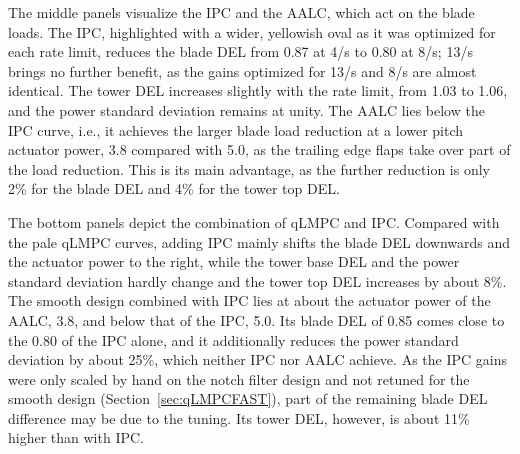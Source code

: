 The middle panels visualize the IPC and the AALC, which act on the blade loads. The IPC, highlighted with a wider, yellowish oval as it was optimized for each rate limit, reduces the blade DEL from 0.87 at 4\textdegree/s to 0.80 at 8\textdegree/s; 13\textdegree/s brings no further benefit, as the gains optimized for 13\textdegree/s and 8\textdegree/s are almost identical. The tower DEL increases slightly with the rate limit, from 1.03 to 1.06, and the power standard deviation remains at unity. The AALC lies below the IPC curve, i.e., it achieves the larger blade load reduction at a lower pitch actuator power, 3.8 compared with 5.0, as the trailing edge flaps take over part of the load reduction. This is its main advantage, as the further reduction is only 2\% for the blade DEL and 4\% for the tower top DEL.

The bottom panels depict the combination of qLMPC and IPC. Compared with the pale qLMPC curves, adding IPC mainly shifts the blade DEL downwards and the actuator power to the right, while the tower base DEL and the power standard deviation hardly change and the tower top DEL increases by about 8\%. The smooth design combined with IPC lies at about the actuator power of the AALC, 3.8, and below that of the IPC, 5.0. Its blade DEL of 0.85 comes close to the 0.80 of the IPC alone, and it additionally reduces the power standard deviation by about 25\%, which neither IPC nor AALC achieve. As the IPC gains were only scaled by hand on the notch filter design and not retuned for the smooth design (Section~\ref{sec:qLMPCFAST}), part of the remaining blade DEL difference may be due to the tuning. Its tower DEL, however, is about 11\% higher than with IPC.

